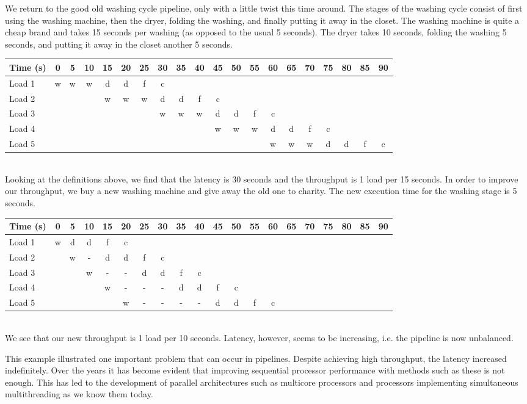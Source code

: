 \documentclass[main.tex]{subfiles}
\begin{document}
\begin{example}
    We return to the good old washing cycle pipeline, only with a little twist this time around. The stages of the washing cycle consist of first using the washing machine, then the dryer, folding the washing, and finally putting it away in the closet. The washing machine is quite a cheap brand and takes 15 seconds per washing (as opposed to the usual 5 seconds). The dryer takes 10 seconds, folding the washing 5 seconds, and putting it away in the closet another 5 seconds.\\[3mm]
    \begin{tabular}{l | *{19}{c}}
        Time (s) & 0 & 5 & 10 & 15 & 20 & 25 & 30 & 35 & 40 & 45 & 50 & 55 & 60 & 65 & 70 & 75 & 80 & 85 & 90 \\
        \hline
        Load 1 & w & w & w & d & d & f & c\\
        Load 2 &   &   &   & w & w & w & d & d & f & c\\
        Load 3 &   &   &   &   &   &   & w & w & w & d & d & f & c \\
        Load 4 &   &   &   &   &   &   &   &   &   & w & w & w & d & d & f & c \\
        Load 5 &   &   &   &   &   &   &   &   &   &   &   &   & w & w & w & d & d & f & c
    \end{tabular} \\[3mm]
    Looking at the definitions above, we find that the latency is 30 seconds and the throughput is 1 load per 15 seconds. In order to improve our throughput, we buy a new washing machine and give away the old one to charity. The new execution time for the washing stage is 5 seconds. \\[3mm]
    \begin{tabular}{l | *{19}{c}}
        Time (s) & 0 & 5 & 10 & 15 & 20 & 25 & 30 & 35 & 40 & 45 & 50 & 55 & 60 & 65 & 70 & 75 & 80 & 85 & 90 \\
        \hline
        Load 1 & w & d & d & f & c\\
        Load 2 &   & w & - & d & d & f & c\\
        Load 3 &   &   & w & - & - & d & d & f & c \\
        Load 4 &   &   &   & w & - & - & - & d & d & f & c \\
        Load 5 &   &   &   &   & w & - & - & - & - & d & d & f & c
    \end{tabular} \\[3mm]
    We see that our new throughput is 1 load per 10 seconds. Latency, however, seems to be increasing, i.e. the pipeline is now unbalanced. 
\end{example}
\noindent This example illustrated one important problem that can occur in pipelines. Despite achieving high throughput, the latency increased indefinitely.
Over the years it has become evident that improving sequential processor performance with methods such as these is not enough. This has led to the development of parallel architectures such as multicore processors and processors implementing simultaneous multithreading as we know them today.
\end{document}
